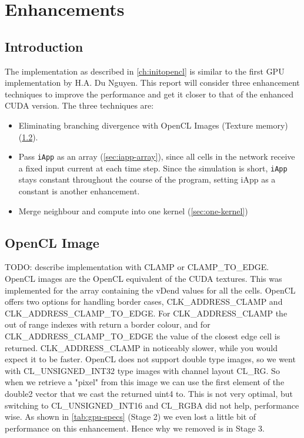 \documentclass[final]{report}
\begin{document}
\chapter{Enhancements}\label{ch:enhancements}

\section{Introduction}
The implementation as described in \cref{ch:initopencl} is similar to the first GPU implementation by H.A. Du Nguyen.
This report will consider three enhancement techniques to improve the performance and get it closer to that of the enhanced CUDA version.
The three techniques are:
\begin{itemize}
	\item Eliminating branching divergence with OpenCL Images (Texture memory) (\cref{sec:image-texture}).
	\item Pass \texttt{iApp} as an array (\cref{sec:iapp-array}), since all cells in the network receive a fixed input current at each time step. Since the simulation is short, \texttt{iApp} stays constant throughout the course of the program, setting iApp as a constant is another enhancement.
	\item Merge neighbour and compute into one kernel (\cref{sec:one-kernel})
\end{itemize}

\section{OpenCL Image}\label{sec:image-texture}
TODO: describe implementation
with CLAMP or CLAMP\_TO\_EDGE.
OpenCL images are the OpenCL equivalent of the CUDA textures.
This was implemented for the array containing the vDend values for all the cells.
OpenCL offers two options for handling border cases, CLK\_ADDRESS\_CLAMP and CLK\_ADDRESS\_CLAMP\_TO\_EDGE.
For CLK\_ADDRESS\_CLAMP the out of range indexes with return a border colour, and for CLK\_ADDRESS\_CLAMP\_TO\_EDGE the value of the closest edge cell is returned.
CLK\_ADDRESS\_CLAMP in noticeably slower, while you would expect it to be faster.
OpenCL does not support double type images, so we went with CL\_UNSIGNED\_INT32 type images with channel layout CL\_RG.
So when we retrieve a "pixel" from this image we can use the first element of the double2 vector that we cast the returned uint4 to.
This is not very optimal, but switching to CL\_UNSIGNED\_INT16 and CL\_RGBA  did not help, performance wise.
As shown in \cref{tab:gpu-specs} (Stage 2) we even lost a little bit of performance on this enhancement.
Hence why we removed is in Stage 3.
\end{document}
